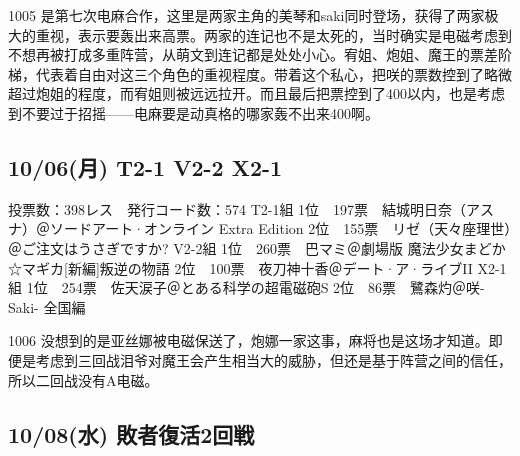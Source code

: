 1005 是第七次电麻合作，这里是两家主角的美琴和saki同时登场，获得了两家极大的重视，表示要轰出来高票。两家的连记也不是太死的，当时确实是电磁考虑到不想再被打成多重阵营，从萌文到连记都是处处小心。宥姐、炮姐、魔王的票差阶梯，代表着自由对这三个角色的重视程度。带着这个私心，把咲的票数控到了略微超过炮姐的程度，而宥姐则被远远拉开。而且最后把票控到了400以内，也是考虑到不要过于招摇——电麻要是动真格的哪家轰不出来400啊。

\subsection{10/06(月) T2-1 V2-2 X2-1}

    投票数：398レス　発行コード数：574
    T2-1組
    1位　197票　結城明日奈（アスナ）＠ソードアート·オンライン Extra Edition
    2位　155票　リゼ（天々座理世）＠ご注文はうさぎですか?
    V2-2組
    1位　260票　巴マミ＠劇場版 魔法少女まどか☆マギカ[新編]叛逆の物語
    2位　100票　夜刀神十香＠デート·ア·ライブII
    X2-1組
    1位　254票　佐天涙子＠とある科学の超電磁砲S
    2位　86票　鷺森灼＠咲-Saki- 全国編

1006 没想到的是亚丝娜被电磁保送了，炮娜一家这事，麻将也是这场才知道。即便是考虑到三回战泪爷对魔王会产生相当大的威胁，但还是基于阵营之间的信任，所以二回战没有A电磁。

\subsection{10/08(水) 敗者復活2回戦}

